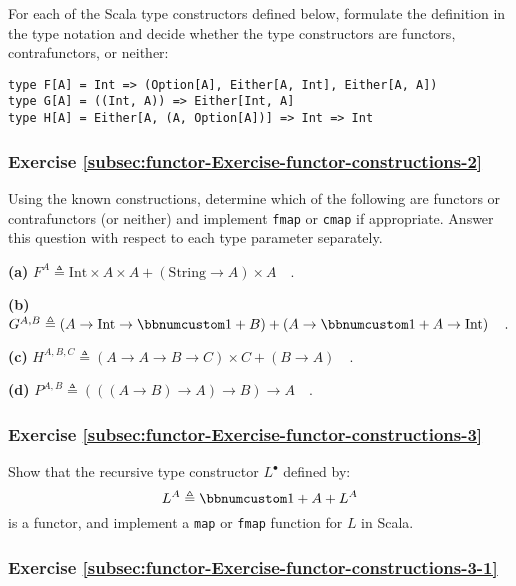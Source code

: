 For each of the Scala type constructors defined below, formulate the
definition in the type notation and decide whether the type constructors
are functors, contrafunctors, or neither:
\begin{lstlisting}
type F[A] = Int => (Option[A], Either[A, Int], Either[A, A])
type G[A] = ((Int, A)) => Either[Int, A]
type H[A] = Either[A, (A, Option[A])] => Int => Int
\end{lstlisting}


\subsubsection{Exercise \label{subsec:functor-Exercise-functor-constructions-2}\ref{subsec:functor-Exercise-functor-constructions-2}}

Using the known constructions, determine which of the following are
functors or contrafunctors (or neither) and implement \lstinline!fmap!
or \lstinline!cmap! if appropriate. Answer this question with respect
to each type parameter separately.

\textbf{(a)} $F^{A}\triangleq\text{Int}\times A\times A+(\text{String}\rightarrow A)\times A\quad.$

\textbf{(b)} $G^{A,B}\triangleq\left(A\rightarrow\text{Int}\rightarrow\bbnum 1+B\right)+\left(A\rightarrow\bbnum 1+A\rightarrow\text{Int}\right)\quad.$

\textbf{(c)} $H^{A,B,C}\triangleq\left(A\rightarrow A\rightarrow B\rightarrow C\right)\times C+\left(B\rightarrow A\right)\quad.$

\textbf{(d)} $P^{A,B}\triangleq\left(\left(\left(A\rightarrow B\right)\rightarrow A\right)\rightarrow B\right)\rightarrow A\quad.$

\subsubsection{Exercise \label{subsec:functor-Exercise-functor-constructions-3}\ref{subsec:functor-Exercise-functor-constructions-3}}

Show that the recursive type constructor $L^{\bullet}$ defined by:
\[
L^{A}\triangleq\bbnum 1+A+L^{A}
\]
is a functor, and implement a \lstinline!map! or \lstinline!fmap!
function for $L$ in Scala.

\subsubsection{Exercise \label{subsec:functor-Exercise-functor-constructions-3-1}\ref{subsec:functor-Exercise-functor-constructions-3-1}}

